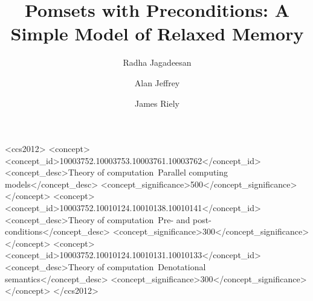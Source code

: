 \documentclass[acmsmall,screen]{acmart}\settopmatter{printfolios=true}
\theoremstyle{acmdefinition}
\begin{document}
\title{Pomsets with Preconditions:
A Simple Model of Relaxed Memory}
\author{Radha Jagadeesan}

\author{Alan Jeffrey}

\author{James Riely}


\begin{abstract}

\end{abstract}

\begin{CCSXML}
<ccs2012>
   <concept>
       <concept_id>10003752.10003753.10003761.10003762</concept_id>
       <concept_desc>Theory of computation~Parallel computing models</concept_desc>
       <concept_significance>500</concept_significance>
       </concept>
   <concept>
       <concept_id>10003752.10010124.10010138.10010141</concept_id>
       <concept_desc>Theory of computation~Pre- and post-conditions</concept_desc>
       <concept_significance>300</concept_significance>
       </concept>
   <concept>
       <concept_id>10003752.10010124.10010131.10010133</concept_id>
       <concept_desc>Theory of computation~Denotational semantics</concept_desc>
       <concept_significance>300</concept_significance>
       </concept>
 </ccs2012>
\end{CCSXML}

\maketitle








\clearpage
\begin{small}

% 
\end{small}
\end{document}
